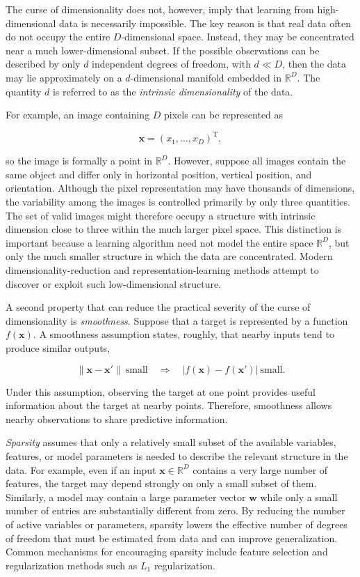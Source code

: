 \documentclass[10pt,twocolumn]{memoir}
\begin{document}
The curse of dimensionality does not, however, imply that learning from high-dimensional data is necessarily impossible. The key reason is that real data often do not occupy the entire $D$-dimensional space. Instead, they may be concentrated near a much lower-dimensional subset. If the possible observations can be described by only $d$ independent degrees of freedom, with $d\ll D$, then the data may lie approximately on a $d$-dimensional manifold embedded in $\mathbb{R}^D$. The quantity $d$ is referred to as the \textit{intrinsic dimensionality} of the data.

For example, an image containing $D$ pixels can be represented as

\begin{equation}
    \mathbf{x} = (x_1,\ldots,x_D)^{\mathrm{T}},
\end{equation}

so the image is formally a point in $\mathbb{R}^D$. However, suppose all images contain the same object and differ only in horizontal position, vertical position, and orientation. Although the pixel representation may have thousands of dimensions, the variability among the images is controlled primarily by only three quantities. The set of valid images might therefore occupy a structure with intrinsic dimension close to three within the much larger pixel space. This distinction is important because a learning algorithm need not model the entire space $\mathbb{R}^D$, but only the much smaller structure in which the data are concentrated. Modern dimensionality-reduction and representation-learning methods attempt to discover or exploit such low-dimensional structure.

A second property that can reduce the practical severity of the curse of dimensionality is \textit{smoothness}. Suppose that a target is represented by a function $f(\mathbf{x})$. A smoothness assumption states, roughly, that nearby inputs tend to produce similar outputs,

\begin{equation}
\|\mathbf{x}-\mathbf{x}'\|\ \text{small}
\quad\Longrightarrow\quad
|f(\mathbf{x})-f(\mathbf{x}')|\ \text{small}.
\end{equation}

Under this assumption, observing the target at one point provides useful information about the target at nearby points. Therefore, smoothness allows nearby observations to share predictive information.

\textit{Sparsity} assumes that only a relatively small subset of the available variables, features, or model parameters is needed to describe the relevant structure in the data. For example, even if an input $\mathbf{x}\in\mathbb{R}^D$ contains a very large number of features, the target may depend strongly on only a small subset of them. Similarly, a model may contain a large parameter vector $\mathbf{w}$ while only a small number of entries are substantially different from zero. By reducing the number of active variables or parameters, sparsity lowers the effective number of degrees of freedom that must be estimated from data and can improve generalization. Common mechanisms for encouraging sparsity include feature selection and regularization methods such as $L_1$ regularization.
\end{document}
